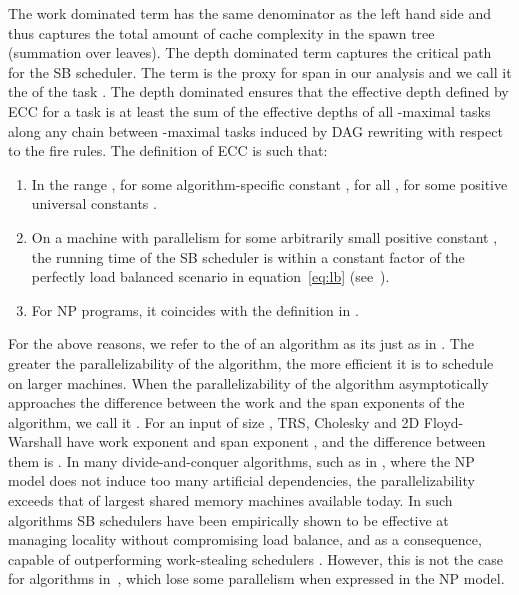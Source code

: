 The work dominated term has the same denominator as the left hand side
and thus captures the total amount of cache complexity in the spawn
tree (summation over leaves).  The depth dominated term captures the
critical path for the SB scheduler.  The term
 is the proxy for span
in our analysis and we call it the  of the task
. The depth dominated ensures that the effective depth defined by
ECC for a task is at least the sum of the effective depths of all
-maximal tasks along any chain between -maximal tasks induced
by DAG rewriting with respect to the fire rules.
The definition of ECC is such that:
\begin{enumerate}
\item
 In the range , for some
algorithm-specific constant , 
for all , for some positive universal constants .
\item
 On a machine with parallelism  for
some arbitrarily small positive constant , the running time
of the SB scheduler is within a constant factor of the perfectly load
balanced scenario in equation~\ref{eq:lb} (see~).
\item For NP programs, it coincides with the definition in \cite{BlellochFiGi11}.
\end{enumerate}

For the above reasons, we refer to the  of an algorithm
as its  just as in \cite{Simhadri13}.  The
greater the parallelizability of the algorithm, the more efficient it
is to schedule on larger machines. When the parallelizability of the
algorithm asymptotically approaches the difference between the work
and the span exponents of the algorithm, we call it .  For an input of size , TRS, Cholesky and 2D
Floyd-Warshall have work exponent  and span exponent , and
the difference between them is . In many divide-and-conquer
algorithms, such as in \cite{BlellochGiSi10}, where the NP model does
not induce too many artificial dependencies, the parallelizability
exceeds that of largest shared memory machines available today. In
such algorithms SB schedulers have been empirically shown to be
effective at managing locality without compromising load balance, and
as a consequence, capable of outperforming work-stealing
schedulers \cite{SimhadriBlFi14}. However, this is not the case for
algorithms in~, which lose some parallelism when expressed
in the NP model.

